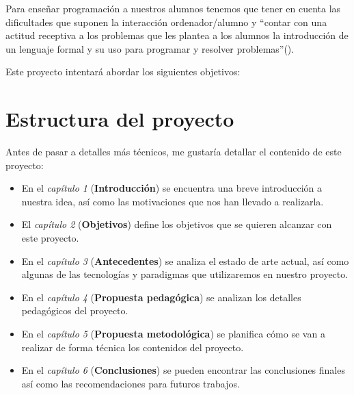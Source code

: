 \bigskip
Para enseñar programación a nuestros alumnos tenemos que tener en cuenta las dificultades que suponen la interacción ordenador/alumno y ``contar con una actitud receptiva a los problemas que les plantea a los alumnos la introducción de un lenguaje formal y su uso para programar y resolver problemas''(\cite{vitale_psycopedagogical_1990}).







Este proyecto intentará abordar los siguientes objetivos:

\section{Estructura del proyecto}

\bigskip
Antes de pasar a detalles más técnicos, me gustaría detallar el contenido de este proyecto:

\begin{itemize}
  \item En el \textit{capítulo 1} (\textbf{Introducción}) se encuentra una breve introducción a nuestra idea, así como las motivaciones que nos han llevado a realizarla.
  \item El \textit{capítulo 2} (\textbf{Objetivos}) define los objetivos que se quieren alcanzar con este proyecto.
  \item En el \textit{capítulo 3} (\textbf{Antecedentes}) se analiza el estado de arte actual, así como algunas de las tecnologías y paradigmas que utilizaremos en nuestro proyecto.
  \item En el \textit{capítulo 4} (\textbf{Propuesta pedagógica}) se analizan los detalles pedagógicos del proyecto.
  \item En el \textit{capítulo 5} (\textbf{Propuesta metodológica}) se planifica cómo se van a realizar de forma técnica los contenidos del proyecto.
  \item En el \textit{capítulo 6} (\textbf{Conclusiones}) se pueden encontrar las conclusiones finales así como las recomendaciones para futuros trabajos.

\end{itemize}


